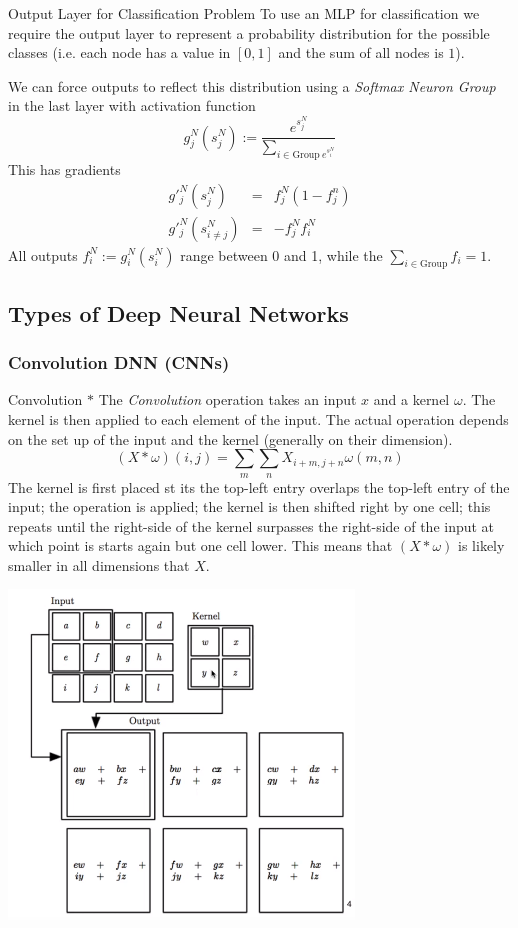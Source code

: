 \documentclass[11pt,a4paper]{article}
\begin{document}
\begin{proposition}{Output Layer for Classification Problem}
  To use an MLP for classification we require the output layer to represent a probability distribution for the possible classes (i.e. each node has a value in $[0,1]$ and the sum of all nodes is $1$).
  \par We can force outputs to reflect this distribution using a \textit{Softmax Neuron Group} in the last layer with activation function
  \[ g_j^N(s_j^N):=\frac{e^{s_j^N}}{\sum_{i\in\text{Group}\ e^{s_i^N}}} \]
  This has gradients
  \[\begin{array}{rcl}
    g'_j^N(s_j^N)&=&f_j^N(1-f_j^n)\\
    g'_j^N(s_{i\neq j}^N)&=&-f_j^Nf_i^N
  \end{array}\]
  All outputs $f_i^N:=g_i^N(s_i^N)$ range between 0 and 1, while the $\sum_{i\in\text{Group}}f_i=1$.
\end{proposition}

\subsection{Types of Deep Neural Networks}

\subsubsection{Convolution DNN (CNNs)}

\begin{definition}{Convolution $*$}
  The \textit{Convolution} operation takes an input $x$ and a kernel $\omega$. The kernel is then applied to each element of the input. The actual operation depends on the set up of the input and the kernel (generally on their dimension).
  \[ (X*\omega)(i,j)=\sum_m\sum_nX_{i+m,j+n}\omega(m,n) \]
  The kernel is first placed st its the top-left entry overlaps the top-left entry of the input; the operation is applied; the kernel is then shifted right by one cell; this repeats until the right-side of the kernel surpasses the right-side of the input at which point is starts again but one cell lower. This means that $(X*\omega)$ is likely smaller in all dimensions that $X$.
  \begin{center}
    \includegraphics[width=.35\textwidth]{2dConvolution.PNG}
  \end{center}
\end{definition}
\end{document}
